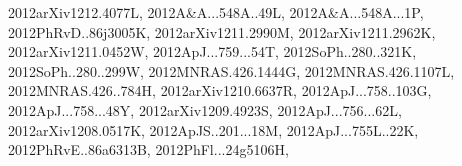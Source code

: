 \documentclass[12pt]{article}
\begin{document}
\begin{description}
{2012arXiv1212.4077L,%
2012A&A...548A..49L,%
2012A&A...548A...1P,%
2012PhRvD..86j3005K,%
2012arXiv1211.2990M,%
2012arXiv1211.2962K,%
2012arXiv1211.0452W,%
2012ApJ...759...54T,%
2012SoPh..280..321K,%
2012SoPh..280..299W,%
2012MNRAS.426.1444G,%
2012MNRAS.426.1107L,%
2012MNRAS.426..784H,%
2012arXiv1210.6637R,%
2012ApJ...758..103G,%
2012ApJ...758...48Y,%
2012arXiv1209.4923S,%
2012ApJ...756...62L,%
2012arXiv1208.0517K,%
2012ApJS..201...18M,%
2012ApJ...755L..22K,%
2012PhRvE..86a6313B,%
2012PhFl...24g5106H,%
}
\end{description}
\end{document}

